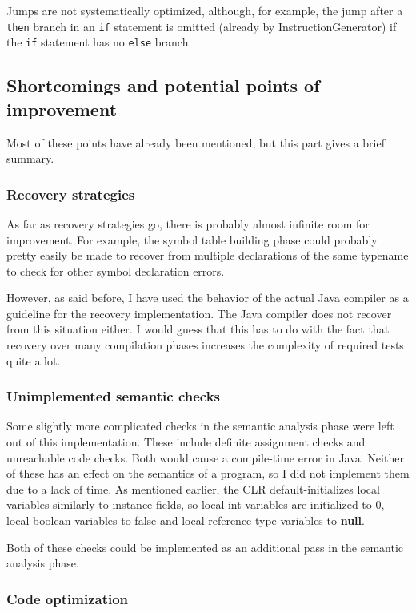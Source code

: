 \documentclass[a4paper,11pt]{article}
\begin{document}
Jumps are not systematically optimized, although, for example, the jump after a \verb,then, branch in an \verb,if, statement is omitted (already by InstructionGenerator) if the \verb,if, statement has no \verb,else, branch.

\subsection{Shortcomings and potential points of improvement}

Most of these points have already been mentioned, but this part gives a brief summary.

\subsubsection{Recovery strategies}

As far as recovery strategies go, there is probably almost infinite room for improvement. For example, the symbol table building phase could probably pretty easily be made to recover from multiple declarations of the same typename to check for other symbol declaration errors.

However, as said before, I have used the behavior of the actual Java compiler as a guideline for the recovery implementation. The Java compiler does not recover from this situation either. I would guess that this has to do with the fact that recovery over many compilation phases increases the complexity of required tests quite a lot.

\subsubsection{Unimplemented semantic checks}

Some slightly more complicated checks in the semantic analysis phase were left out of this implementation. These include definite assignment checks and unreachable code checks. Both would cause a compile-time error in Java. Neither of these has an effect on the semantics of a program, so I did not implement them due to a lack of time. As mentioned earlier, the CLR default-initializes local variables similarly to instance fields, so local int variables are initialized to 0, local boolean variables to false and local reference type variables to \textbf{null}.

Both of these checks could be implemented as an additional pass in the semantic analysis phase.

\subsubsection{Code optimization}
\end{document}

